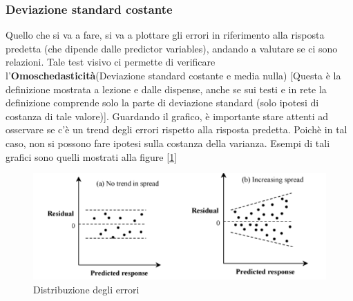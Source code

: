 \subsubsection{Deviazione standard costante}
Quello che si va a fare, si va a plottare gli errori in riferimento alla risposta predetta (che dipende dalle predictor variables), andando a valutare se ci sono relazioni. Tale test visivo ci permette di verificare l'\textbf{Omoschedasticità}(Deviazione standard costante e media nulla) [Questa è la definizione mostrata a lezione e dalle dispense, anche se sui testi e in rete la definizione comprende solo la parte di deviazione standard (solo ipotesi di costanza di tale valore)]. Guardando il grafico, è importante stare attenti ad osservare se c'è un trend degli errori rispetto alla risposta predetta. Poichè in tal caso, non si possono fare ipotesi sulla costanza della varianza. Esempi di tali grafici sono quelli mostrati alla figure [\ref{img:constant-deviation}]

\begin{figure}[h]
\centering
\includegraphics[width=.7\textwidth]{img/chapter-5/constant-deviation.png}
\caption{Distribuzione degli errori}\label{img:constant-deviation}
\end{figure}


